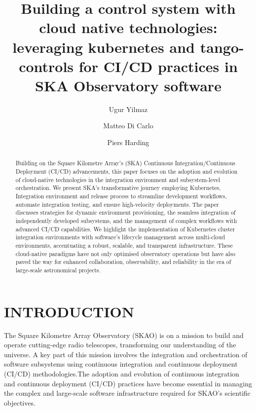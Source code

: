 \documentclass[a4paper]{spie}  %
\title{Building a control system with cloud native technologies: leveraging kubernetes and tango-controls for CI/CD practices in SKA Observatory software}
\author[a]{Ugur Yilmaz}
\author[b]{Matteo Di Carlo}
\author[a]{Piers Harding}
\affil[a]{SKA Observatory, United Kingdom}
\affil[b]{INAF, Italy}
\begin{document}
 
\maketitle

\begin{abstract}

 Building on the Square Kilometre Array's (SKA) Continuous Integration/Continuous Deployment (CI/CD) advancements, this paper focuses on the adoption and evolution of cloud-native technologies in the integration environment and subsystem-level orchestration. We present SKA's transformative journey employing Kubernetes, Integration environment and release process to streamline development workflows, automate integration testing, and ensure high-velocity deployments. The paper discusses strategies for dynamic environment provisioning, the seamless integration of independently developed subsystems, and the management of complex workflows with advanced CI/CD capabilities. We highlight the implementation of Kubernetes cluster integration environments with software's lifecycle management across multi-cloud environments, accentuating a robust, scalable, and transparent infrastructure. These cloud-native paradigms have not only optimised observatory operations but have also paved the way for enhanced collaboration, observability, and reliability in the era of large-scale astronomical projects.
 
\end{abstract}


\section{INTRODUCTION}
\label{sec:intro}  %

The Square Kilometre Array Observatory (SKAO) is on a mission to build and operate cutting-edge radio telescopes, transforming our understanding of the universe. A key part of this mission involves the integration and orchestration of software subsystems using continuous integration and continuous deployment (CI/CD) methodologies.The adoption and evolution of continuous integration and continuous deployment (CI/CD) practices have become essential in managing the complex and large-scale software infrastructure required for SKAO's scientific objectives.
\end{document}
